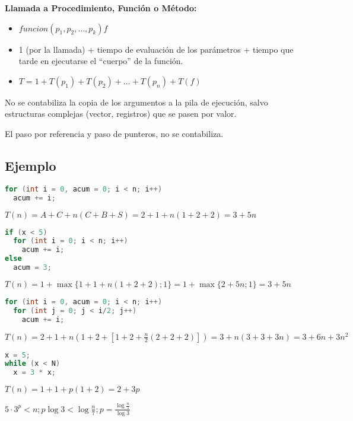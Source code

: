 \textbf{Llamada a Procedimiento, Función o Método:}
\begin{itemize}
	\item $funcion(p_1, p_2, \dots, p_k) f$
	\item 1 (por la llamada) + tiempo de evaluación de los parámetros + tiempo que tarde en ejecutarse el \enquote{cuerpo} de la función.
	\item $T = 1 + T(p_1) + T(p_2) + \dots + T(p_n) + T(f)$
\end{itemize}

No se contabiliza la copia de los argumentos a la pila de ejecución, salvo estructuras complejas (vector, registros) que se pasen por valor.

El paso por referencia y paso de punteros, no se contabiliza.

\subsection{Ejemplo}\label{subsec:ejemplo}
\begin{lstlisting}[language=Java,label={lst:lstlisting}]
for (int i = 0, acum = 0; i < n; i++)
  acum += i;
\end{lstlisting}

$T(n) = A + C + n ( C + B + S ) = 2 + 1 + n ( 1 + 2 + 2 ) = 3 + 5 n$

\begin{lstlisting}[language=Java,label={lst:lstlisting2}]
if (x < 5)
  for (int i = 0; i < n; i++)
    acum += i;
else
  acum = 3;
\end{lstlisting}

$T(n) = 1 + \max \{ 1 + 1 + n(1+2+2) ; 1 \} = 1 + \max \{ 2 + 5 n ; 1 \} = 3 + 5n$

\begin{lstlisting}[language=Java,label={lst:lstlisting3}]
for (int i = 0, acum = 0; i < n; i++)
  for (int j = 0; j < i/2; j++)
    acum += i;
\end{lstlisting}

$T(n) = 2 + 1 + n ( 1 + 2 + [ 1 + 2 + \frac{n}{2} ( 2 + 2 + 2) ]) = 3 + n (3 + 3 + 3 n) = 3 + 6 n + 3 n^2$

\begin{lstlisting}[language=Java,label={lst:lstlisting4}]
x = 5;
while (x < N)
  x = 3 * x;
\end{lstlisting}

$T(n) = 1 + 1 + p ( 1 + 2 ) = 2 + 3 p$

$5 \cdot 3^p < n; p \log 3 < \log \frac{n}{7}; p = \frac{\log \frac{n}{5}}{\log 3}$
\pagebreak

